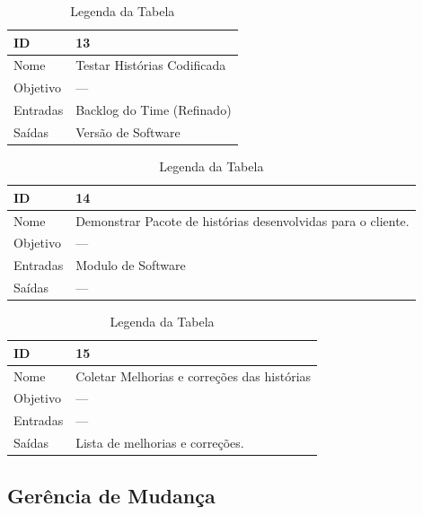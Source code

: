   \begin{table}[H]
    \centering
      \begin{tabular}{| m{5em} | m{10cm} |}
        \hline
        ID       & 13   \\ \hline
        Nome     & Testar Histórias Codificada  \\ \hline
        Objetivo & ---  \\ \hline
        Entradas & Backlog do Time (Refinado)\\ \hline
        Saídas   & Versão de Software \\ \hline
      \end{tabular}
      \caption{Legenda da Tabela}
      \label{tabela:atividade13}
  \end{table}

  \begin{table}[H]
    \centering
      \begin{tabular}{| m{5em} | m{10cm} |}
        \hline
        ID       & 14   \\ \hline
        Nome     & Demonstrar Pacote de histórias desenvolvidas para o cliente. \\ \hline
        Objetivo & --- \\ \hline
        Entradas & Modulo de Software\\ \hline
        Saídas   &  --- \\ \hline
      \end{tabular}
      \caption{Legenda da Tabela}
      \label{tabela:atividade14}
  \end{table}

  \begin{table}[H]
    \centering
      \begin{tabular}{| m{5em} | m{10cm} |}
        \hline
        ID       & 15   \\ \hline
        Nome     & Coletar Melhorias e correções das histórias  \\ \hline
        Objetivo & ---  \\ \hline
        Entradas & ---\\ \hline
        Saídas   & Lista de melhorias e correções. \\ \hline
      \end{tabular}
      \caption{Legenda da Tabela}
      \label{tabela:atividade15}
  \end{table}

\subsection{Gerência de Mudança}\label{sec:gerencia}

